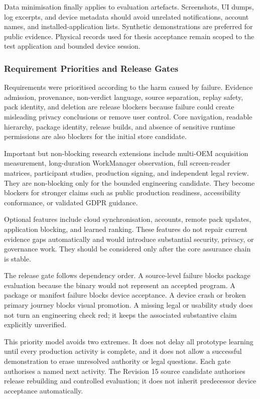 Data minimisation finally applies to evaluation artefacts. Screenshots, UI dumps, log excerpts, and device metadata should avoid unrelated notifications, account names, and installed-application lists. Synthetic demonstrations are preferred for public evidence. Physical records used for thesis acceptance remain scoped to the test application and bounded device session.

\subsubsection{Requirement Priorities and Release Gates}

Requirements were prioritised according to the harm caused by failure. Evidence admission, provenance, non-verdict language, source separation, replay safety, pack identity, and deletion are release blockers because failure could create misleading privacy conclusions or remove user control. Core navigation, readable hierarchy, package identity, release builds, and absence of sensitive runtime permissions are also blockers for the initial store candidate.

Important but non-blocking research extensions include multi-OEM acquisition measurement, long-duration WorkManager observation, full screen-reader matrices, participant studies, production signing, and independent legal review. They are non-blocking only for the bounded engineering candidate. They become blockers for stronger claims such as public production readiness, accessibility conformance, or validated GDPR guidance.

Optional features include cloud synchronisation, accounts, remote pack updates, application blocking, and learned ranking. These features do not repair current evidence gaps automatically and would introduce substantial security, privacy, or governance work. They should be considered only after the core assurance chain is stable.

The release gate follows dependency order. A source-level failure blocks package evaluation because the binary would not represent an accepted program. A package or manifest failure blocks device acceptance. A device crash or broken primary journey blocks visual promotion. A missing legal or usability study does not turn an engineering check red; it keeps the associated substantive claim explicitly unverified.

This priority model avoids two extremes. It does not delay all prototype learning until every production activity is complete, and it does not allow a successful demonstration to erase unresolved authority or legal questions. Each gate authorises a named next activity. The Revision 15 source candidate authorises release rebuilding and controlled evaluation; it does not inherit predecessor device acceptance automatically.

